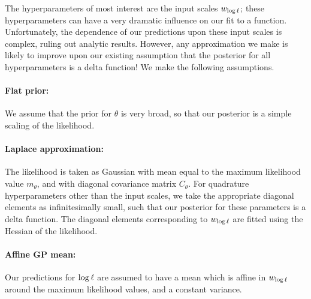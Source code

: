 \documentclass{article}
\begin{document}
The hyperparameters of most interest are the input scales $w_\tr$; these hyperparameters can have a very dramatic influence on our fit to a function. Unfortunately, the dependence of our predictions upon these input scales is complex, ruling out analytic results. However, any approximation we make is likely to improve upon our existing assumption that the posterior for all hyperparameters is a delta function! We make the following assumptions.

 \paragraph*{Flat prior:} We assume that the prior for $\theta$ is very broad, so that our posterior is a simple scaling of the likelihood. 
\paragraph*{Laplace approximation:} The likelihood  is taken as Gaussian with mean equal to the maximum likelihood value $m_\theta$, and with diagonal covariance matrix $C_\theta$. For quadrature hyperparameters other than the input scales, we take the appropriate diagonal elements as infinitesimally small, such that our posterior for these parameters is a delta function. The diagonal elements corresponding to $w_\tr$ are fitted using the Hessian of the likelihood.
\paragraph*{Affine GP mean:} Our predictions for $\tr$ are assumed to have a \gpb mean which is affine in $w_\tr$ around the maximum likelihood values, and a constant variance.  
\end{document}
